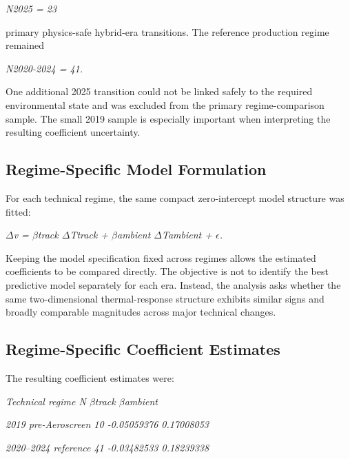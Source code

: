 \begin{center}\textit{N2025 = 23}\end{center}

primary physics-safe hybrid-era transitions. The reference production regime remained

\begin{center}\textit{N2020-2024 = 41.}\end{center}

One additional 2025 transition could not be linked safely to the required environmental state and was excluded from the primary regime-comparison sample. The small 2019 sample is especially important when interpreting the resulting coefficient uncertainty.

\subsection{Regime-Specific Model Formulation}
For each technical regime, the same compact zero-intercept model structure was fitted:

\begin{center}\textit{\ensuremath{\Delta}v = \ensuremath{\beta}track \ensuremath{\Delta}Ttrack + \ensuremath{\beta}ambient \ensuremath{\Delta}Tambient + \ensuremath{\epsilon}.}\end{center}

Keeping the model specification fixed across regimes allows the estimated coefficients to be compared directly. The objective is not to identify the best predictive model separately for each era. Instead, the analysis asks whether the same two-dimensional thermal-response structure exhibits similar signs and broadly comparable magnitudes across major technical changes.

\subsection{Regime-Specific Coefficient Estimates}
The resulting coefficient estimates were:

\begin{center}\textit{Technical regime        N     \ensuremath{\beta}track       \ensuremath{\beta}ambient}\end{center}

\begin{center}\textit{2019 pre-Aeroscreen     10 -0.05059376   0.17008053}\end{center}

\begin{center}\textit{2020--2024 reference     41 -0.03482533   0.18239338}\end{center}

